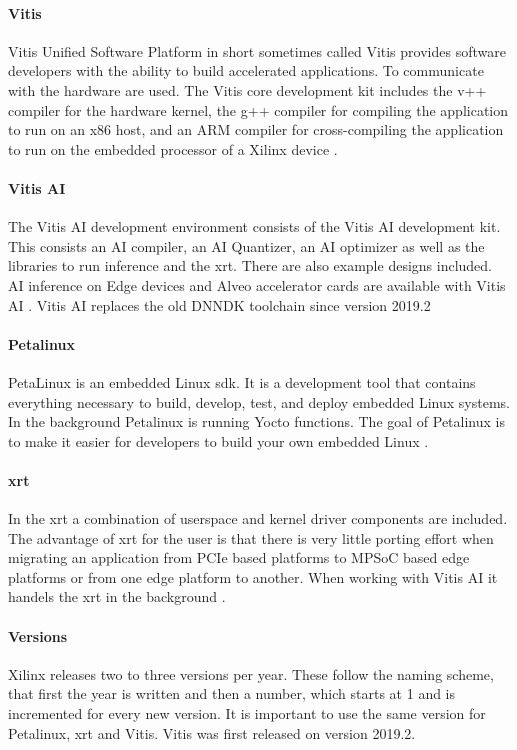 \paragraph{Vitis}
Vitis Unified Software Platform in short sometimes called Vitis provides software developers with the ability to build accelerated applications.
To communicate with the hardware  are used.
The Vitis core development kit includes the v++ compiler for the hardware kernel, the g++ compiler for compiling the application to run on an x86 host, and an ARM compiler for cross-compiling the application to run on the embedded processor of a Xilinx device \cite{vitis_user_guide}.

\paragraph{Vitis AI}
The Vitis AI development environment consists of the Vitis AI development kit.
This consists an AI compiler, an AI Quantizer, an AI optimizer as well as the libraries to run inference and the \acrfull{xrt}.
There are also example designs included.
AI inference on Edge devices and Alveo accelerator cards are available with Vitis AI \cite{vitis_ai_user_guide}.
Vitis AI replaces the old DNNDK toolchain since version 2019.2 

\paragraph{Petalinux}
PetaLinux is an embedded Linux \acrfull{sdk}.
It is a development tool that contains everything necessary to build, develop, test, and deploy embedded Linux systems.
In the background Petalinux is running Yocto functions.
The goal of Petalinux is to make it easier for developers to build your own embedded Linux \cite{petalinux_user_guide}.

\paragraph{\acrlong{xrt}}
In the \acrfull{xrt} a combination of userspace and kernel driver components are included.
The advantage of \acrshort{xrt} for the user is that there is very little porting effort when migrating an application from PCIe based platforms to MPSoC based edge platforms or from one edge platform to another.
When working with Vitis AI it handels the \acrshort{xrt} in the background \cite{xrt_overview}.

\paragraph{Versions}
Xilinx releases two to three versions per year.
These follow the naming scheme, that first the year is written and then a number, which starts at 1 and is incremented for every new version.
It is important to use the same version for Petalinux, \acrshort{xrt} and Vitis.
Vitis was first released on version 2019.2.

